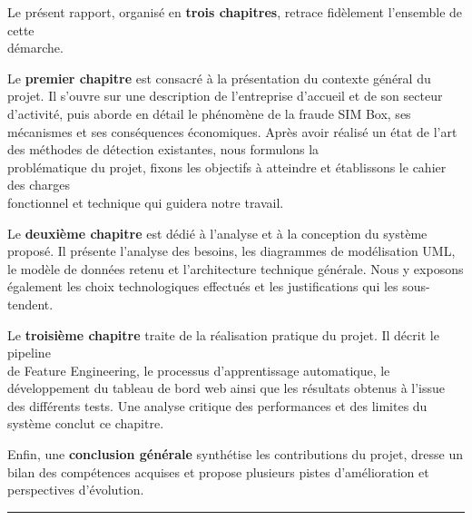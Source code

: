 \documentclass[12pt, oneside, a4paper]{report}
\begin{document}
Le présent rapport, organisé en \textbf{trois chapitres}, retrace fidèlement l'ensemble de cette\\ démarche.

Le \textbf{premier chapitre} est consacré à la présentation du contexte général du projet. Il s'ouvre sur une description de l'entreprise d'accueil et de son secteur d'activité, puis aborde en détail le phénomène de la fraude SIM Box, ses mécanismes et ses conséquences économiques. Après avoir réalisé un état de l'art des méthodes de détection existantes, nous formulons la \\ problématique du projet, fixons les objectifs à atteindre et établissons le cahier des charges\\ fonctionnel et technique qui guidera notre travail.

Le \textbf{deuxième chapitre} est dédié à l'analyse et à la conception du système proposé. Il présente l'analyse des besoins, les diagrammes de modélisation UML, le modèle de données retenu et l'architecture technique générale. Nous y exposons également les choix technologiques 
effectués et les justifications qui les sous-tendent.

Le \textbf{troisième chapitre} traite de la réalisation pratique du projet. Il décrit le pipeline \\de Feature Engineering, le processus d'apprentissage automatique, le développement du tableau de bord web ainsi que les résultats obtenus à l'issue des différents tests. Une analyse critique des performances et des limites du système conclut ce chapitre.

Enfin, une \textbf{conclusion générale} synthétise les contributions du projet, dresse un bilan des compétences acquises et propose plusieurs pistes d'amélioration et perspectives d'évolution.

\clearpage
\thispagestyle{fancy} %
\setcounter{section}{0}

\noindent\rule[-0.2cm]{0.45cm}{1.2cm}\hspace{0.15cm}%
\raisebox{0.85cm}{\rule{0.85\textwidth}{0.5pt}}\\[0.3cm]
\noindent{}\\[1cm]
\end{document}
